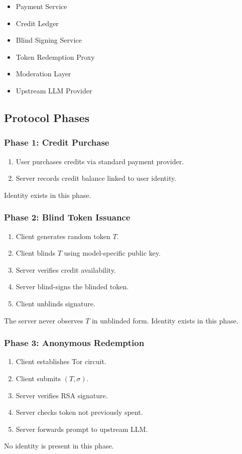 \documentclass[11pt,a4paper]{article}
\begin{document}
\begin{itemize}
  \item Payment Service
  \item Credit Ledger
  \item Blind Signing Service
  \item Token Redemption Proxy
  \item Moderation Layer
  \item Upstream LLM Provider
\end{itemize}

\subsection{Protocol Phases}

\subsubsection{Phase 1: Credit Purchase}

\begin{enumerate}
  \item User purchases credits via standard payment provider.
  \item Server records credit balance linked to user identity.
\end{enumerate}
Identity exists in this phase.

\subsubsection{Phase 2: Blind Token Issuance}

\begin{enumerate}
  \item Client generates random token $T$.
  \item Client blinds $T$ using model-specific public key.
  \item Server verifies credit availability.
  \item Server blind-signs the blinded token.
  \item Client unblinds signature.
\end{enumerate}
The server never observes $T$ in unblinded form. Identity exists in this phase.

\subsubsection{Phase 3: Anonymous Redemption}

\begin{enumerate}
  \item Client establishes Tor circuit.
  \item Client submits $(T, \sigma)$.
  \item Server verifies RSA signature.
  \item Server checks token not previously spent.
  \item Server forwards prompt to upstream LLM.
\end{enumerate}
No identity is present in this phase.
\end{document}
